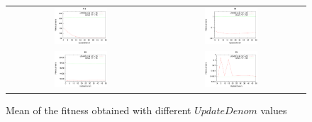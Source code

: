 \documentclass[preprint,3p]{elsarticle}
\begin{document}
      
\begin{figure}[!t]
\centering
\begin{tabular}{cc}
  \includegraphics[width=0.37\textwidth]{images/Update/GODE/Update_GODE_F14_15.eps} & \includegraphics[width=0.37\textwidth]{images/Update/GODE/Update_GODE_F4_60.eps}  \\
  \includegraphics[width=0.37\textwidth]{images/Update/GADE/Update_GADE_F8_15.eps} & \includegraphics[width=0.37\textwidth]{images/Update/GADE/Update_GADE_F9_60.eps}  \\
\end{tabular}
\caption{Mean of the fitness obtained with different $UpdateDenom$ values}
\label{fig:updateDenom}
\end{figure}
\end{document}
